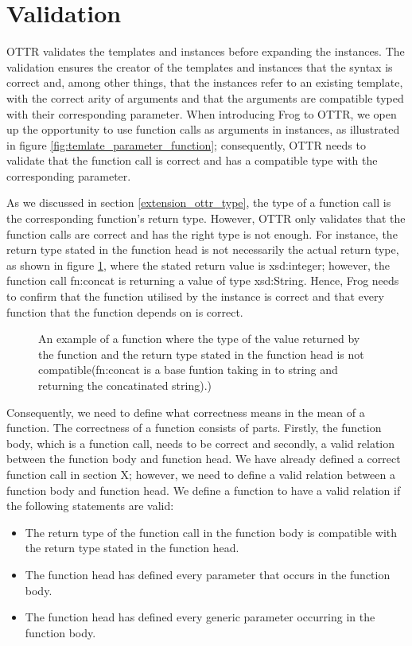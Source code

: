 \section{Validation}
\label{designValidation}
OTTR validates the templates and instances before expanding the instances. The validation ensures the creator of the templates and instances that the syntax is correct and, among other things, that the instances refer to an existing template, with the correct arity of arguments and that the arguments are compatible typed with their corresponding parameter. When introducing Frog to OTTR, we open up the opportunity to use function calls as arguments in instances, as illustrated in figure \ref{fig:temlate_parameter_function}; consequently, OTTR needs to validate that the function call is correct and has a compatible type with the corresponding parameter. 

\para
As we discussed in section \ref{extension_ottr_type}, the type of a function call is the corresponding function's return type. However, OTTR only validates that the function calls are correct and has the right type is not enough. For instance, the return type stated in the function head is not necessarily the actual return type, as shown in figure \ref{fig:wrong_function}, where the stated return value is xsd:integer; however, the function call fn:concat is returning a value of type xsd:String. Hence, Frog needs to confirm that the function utilised by the instance is correct and that every function that the function depends on is correct.

\begin{figure}
    \centering
    
    \caption{An example of a function where the type of the value returned by the function and the return type stated in the function head is not compatible(fn:concat is a base funtion taking in to string and returning the concatinated string).)}
    \label{fig:wrong_function}
\end{figure}

\para
Consequently, we need to define what correctness means in the mean of a function. The correctness of a function consists of parts. Firstly, the function body, which is a function call, needs to be correct and secondly, a valid relation between the function body and function head. We have already defined a correct function call in section X; however, we need to define a valid relation between a function body and function head. We define a function to have a valid relation if the following statements are valid:
\begin{itemize}
    \item The return type of the function call in the function body is compatible with the return type stated in the function head. 
    \item The function head has defined every parameter that occurs in the function body.
    \item The function head has defined every generic parameter occurring in the function body.
\end{itemize} 

